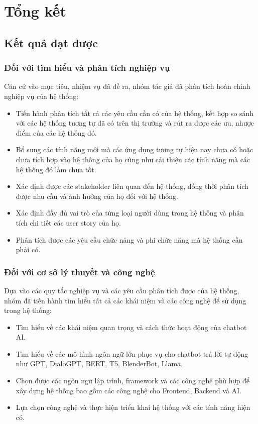 \newpage
\section{Tổng kết}
\subsection{Kết quả đạt được}
\subsubsection{Đối với tìm hiểu và phân tích nghiệp vụ}
Căn cứ vào mục tiêu, nhiệm vụ đã đề ra, nhóm tác giả đã phân tích hoàn chỉnh nghiệp vụ của hệ
thống:
\begin{itemize}
    \item Tiến hành phân tích tất cả các yêu cầu cần có của hệ thống, kết hợp so sánh với các hệ thống tương
    tự đã có trên thị trường và rút ra được các ưu, nhược điểm của các hệ thống đó.
    \item Bổ sung các tính năng mới mà các ứng dụng tương tự hiện nay chưa có hoặc chưa tích hợp vào hệ
    thống của họ cũng như cải thiện các tính năng mà các hệ thống đó làm chưa tốt.
    \item Xác định được các stakeholder liên quan đến hệ thống, đồng thời phân tích được nhu cầu và ảnh hưởng của họ đối với hệ thống.
    \item Xác định đầy đủ vai trò của từng loại người dùng trong hệ thống và phân tích chi tiết các user
    story của họ.
    \item Phân tích được các yêu cầu chức năng và phi chức năng mà hệ thống cần phải có.
\end{itemize}
\subsubsection{Đối với cơ sở lý thuyết và công nghệ}
Dựa vào các quy tắc nghiệp vụ và các yêu cầu phân tích được của hệ thống, nhóm đã tiến hành tìm
hiểu tất cả các khái niệm và các công nghệ để sử dụng trong hệ thống:
\begin{itemize}
    \item Tìm hiểu về các khái niệm quan trọng và cách thức hoạt động của chatbot AI.
    \item Tìm hiểu về các mô hình ngôn ngữ lớn phục vụ cho chatbot trả lời tự động như GPT, DialoGPT,
    BERT, T5, BlenderBot, Llama.
    \item Chọn được các ngôn ngữ lập trình, framework và các công nghệ phù hợp để xây dựng hệ thống bao gồm các công nghệ cho Frontend, Backend và AI.
    \item Lựa chọn công nghệ và thực hiện triển khai hệ thống với các tính năng hiện có.
\end{itemize}
